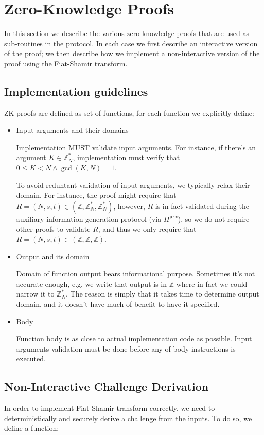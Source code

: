 \documentclass[11pt]{article}
\newcommand{\proof}[1]{\ensuremath{\Pi^{\mathtt{#1}}}}
\newcommand{\Z}{\mathbb{Z}}
\newcommand{\?}[1]{\stackrel{?}{#1}}
\begin{document}
\section{Zero-Knowledge Proofs}
In this section we describe the various zero-knowledge proofs that are used as sub-routines in the protocol. In each case we first describe an interactive version of the proof; we then describe how we implement a non-interactive version of the proof using the Fiat-Shamir transform.

\subsection{Implementation guidelines}
ZK proofs are defined as set of functions, for each function we explicitly define:
\begin{itemize}
\item Input arguments and their domains

Implementation MUST validate input arguments. For instance, if there's an argument $K \in \Z_N^*$, implementation must verify that $0 \le K < N \land \gcd(K, N) = 1$.

To avoid reduntant validation of input arguments, we typically relax their domain. For instance, the proof might require that $R = (N, s, t) \in (\Z, \Z^*_N, \Z^*_N)$, however, $R$ is in fact validated during the auxiliary information generation protocol (via $\proof{prm}$), so we do not require other proofs to validate $R$, and thus we only require that $R = (N, s, t) \in (\Z, \Z, \Z)$.

\item Output and its domain

Domain of function output bears informational purpose. Sometimes it's not accurate enough, e.g. we write that output is in $\Z$ where in fact we could narrow it to $\Z^*_N$. The reason is simply that it takes time to determine output domain, and it doesn't have much of benefit to have it specified.

\item Body

Function body is as close to actual implementation code as possible. Input arguments validation must be done before any of body instructions is executed.
\end{itemize}

\subsection{Non-Interactive Challenge Derivation}
In order to implement Fiat-Shamir transform correctly, we need to deterministically and securely derive a challenge
from the inputs. To do so, we define a function:
\end{document}
